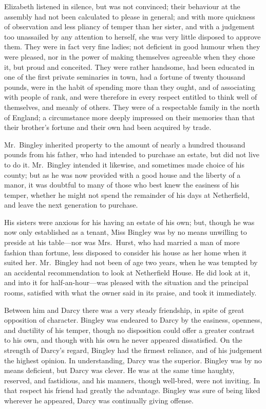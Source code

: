 \documentclass[12pt,english]{book}
\begin{document}
Elizabeth listened in silence, but was not convinced; their behaviour
at the assembly had not been calculated to please in general; and
with more quickness of observation and less pliancy of temper than
her sister, and with a judgement too unassailed by any attention to
herself, she was very little disposed to approve them. They were in
fact very fine ladies; not deficient in good humour when they were
pleased, nor in the power of making themselves agreeable when they
chose it, but proud and conceited. They were rather handsome, had
been educated in one of the first private seminaries in town, had
a fortune of twenty thousand pounds, were in the habit of spending
more than they ought, and of associating with people of rank, and
were therefore in every respect entitled to think well of themselves,
and meanly of others. They were of a respectable family in the north
of England; a circumstance more deeply impressed on their memories
than that their brother's fortune and their own had been acquired
by trade.

Mr.\ Bingley inherited property to the amount of nearly a hundred
thousand pounds from his father, who had intended to purchase an estate,
but did not live to do it. Mr.\ Bingley intended it likewise, and
sometimes made choice of his county; but as he was now provided with
a good house and the liberty of a manor, it was doubtful to many of
those who best knew the easiness of his temper, whether he might not
spend the remainder of his days at Netherfield, and leave the next
generation to purchase.

His sisters were anxious for his having an estate of his own; but,
though he was now only established as a tenant, Miss Bingley was by
no means unwilling to preside at his table\mbox{---}nor was Mrs.\ Hurst,
who had married a man of more fashion than fortune, less disposed
to consider his house as her home when it suited her. Mr.\ Bingley
had not been of age two years, when he was tempted by an accidental
recommendation to look at Netherfield House. He did look at it, and
into it for half-an-hour\mbox{---}was pleased with the situation
and the principal rooms, satisfied with what the owner said in its
praise, and took it immediately.

Between him and Darcy there was a very steady friendship, in spite
of great opposition of character. Bingley was endeared to Darcy by
the easiness, openness, and ductility of his temper, though no disposition
could offer a greater contrast to his own, and though with his own
he never appeared dissatisfied. On the strength of Darcy's regard,
Bingley had the firmest reliance, and of his judgement the highest
opinion. In understanding, Darcy was the superior. Bingley was by
no means deficient, but Darcy was clever. He was at the same time
haughty, reserved, and fastidious, and his manners, though well-bred,
were not inviting. In that respect his friend had greatly the advantage.
Bingley was sure of being liked wherever he appeared, Darcy was continually
giving offense.
\end{document}
